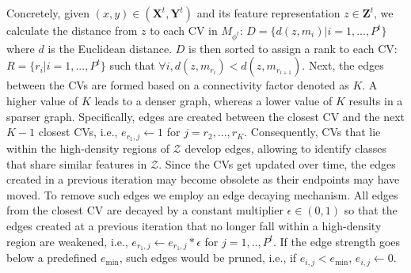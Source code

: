 \documentclass[10pt,twocolumn,letterpaper]{article}
\begin{document}
Concretely, given $(x,y) \in (\mathbf{X}^t, \mathbf{Y}^t)$ and its feature representation $z \in \mathbf{Z}^t$, we calculate the distance from $z$ to each CV in $M_{\phi^{t}}$:
$D = \{ d(z, m_i) | i = 1,...,P^t\} $ where $d$ is the Euclidean distance. 
$D$ is then sorted to assign a rank to each CV:
$R = \{ r_i | i= 1,...,P^t\}$ such that $\forall i, d(z, m_{r_i})<d(z, m_{r_{i+1}})$. Next, the edges between the CVs are formed based on a connectivity factor denoted as $K$. A higher value of $K$ leads to a denser graph, whereas a lower value of $K$ results in a sparser graph. Specifically, edges are created between the closest CV and the next $K-1$ closest CVs, i.e., $e_{{r_1},j}\gets1$ for $j = r_{2},...,r{_{K}}$. 
Consequently, CVs that lie within the high-density regions of $\mathcal{Z}$  develop edges, allowing to identify classes that share similar features in $\mathcal{Z}$. Since the CVs get updated over time, the edges created in a previous iteration may become obsolete as their endpoints may have moved. To remove such edges we employ an edge decaying mechanism. All edges from the closest CV are decayed by a constant multiplier $\epsilon \in (0,1)$ so that the edges created at a previous iteration that no longer fall within a high-density region are weakened, i.e., $e_{r_{1},j}\gets e_{r_{1},j} * \epsilon$ for $ j = 1,.., P^t $.
If the edge strength goes below a predefined $e_{\mathrm{min}}$, such edges would be pruned, i.e., if $e_{i,j} < e_{\mathrm{min}}$, $e_{i,j} \gets 0$.
\end{document}

